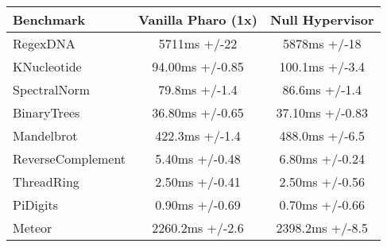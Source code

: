 \begin{table}[ht]

 	\centering
 	\begin{tabular}{lcc}%
			\toprule
			\textbf{Benchmark}
 			& \textbf{Vanilla Pharo \VM (1x)}
			& \textbf{Null Hypervisor}\\
			
		\midrule
		RegexDNA & 5711ms +/-22 & 5878ms +/-18 \\\midrule%
		KNucleotide & 94.00ms +/-0.85 & 100.1ms +/-3.4\\\midrule%
		SpectralNorm & 79.8ms +/-1.4 & 86.6ms +/-1.4\\\midrule%
		BinaryTrees & 36.80ms +/-0.65 & 37.10ms +/-0.83 \\\midrule%
		Mandelbrot & 422.3ms +/-1.4 & 488.0ms +/-6.5 \\\midrule%
		ReverseComplement & 5.40ms +/-0.48 & 6.80ms +/-0.24 \\\midrule%
		ThreadRing & 2.50ms +/-0.41 & 2.50ms +/-0.56\\\midrule%
		PiDigits & 0.90ms +/-0.69 & 0.70ms +/-0.66 \\\midrule%
		Meteor & 2260.2ms +/-2.6 & 2398.2ms +/-8.5 \\\midrule%

\end{tabular}
\end{table}
